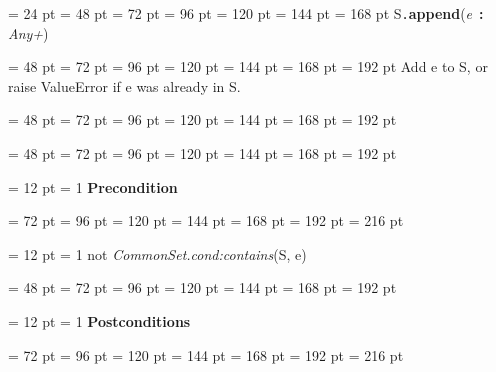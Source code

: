 {{\par \noindent  \leftskip = 24 pt  \leftmargini = 48 pt  \leftmarginii = 72 pt  \leftmarginiii = 96 pt  \leftmarginiv = 120 pt  \leftmarginv = 144 pt  \leftmarginvi = 168 pt S{\tt .\/}{\bf {\large {\bf append\/}}\/}({\em e\/}~{\bf :}  {\em Any+\/}){\par \noindent
{\par \noindent  \leftskip = 48 pt  \leftmargini = 72 pt  \leftmarginii = 96 pt  \leftmarginiii = 120 pt  \leftmarginiv = 144 pt  \leftmarginv = 168 pt  \leftmarginvi = 192 pt  Add e to S, or raise ValueError if e was already in S.\par}
{\par \noindent  \leftskip = 48 pt  \leftmargini = 72 pt  \leftmarginii = 96 pt  \leftmarginiii = 120 pt  \leftmarginiv = 144 pt  \leftmarginv = 168 pt  \leftmarginvi = 192 pt {\par \noindent
\par}
\par}
{\par \noindent  \leftskip = 48 pt  \leftmargini = 72 pt  \leftmarginii = 96 pt  \leftmarginiii = 120 pt  \leftmarginiv = 144 pt  \leftmarginv = 168 pt  \leftmarginvi = 192 pt {\par \noindent
{\par \pagebreak[3.100000] \noindent \hangindent = 12 pt \hangafter = 1 
{\bf Precondition\/}\par}
{\par \noindent  \leftskip = 72 pt  \leftmargini = 96 pt  \leftmarginii = 120 pt  \leftmarginiii = 144 pt  \leftmarginiv = 168 pt  \leftmarginv = 192 pt  \leftmarginvi = 216 pt {\par \noindent
{\par \pagebreak[3.000000] \noindent \hangindent = 12 pt \hangafter = 1 
not  {\em CommonSet.cond:contains\/}(S, e)\par}
\par}
\par}
\par}
\par}
{\par \noindent  \leftskip = 48 pt  \leftmargini = 72 pt  \leftmarginii = 96 pt  \leftmarginiii = 120 pt  \leftmarginiv = 144 pt  \leftmarginv = 168 pt  \leftmarginvi = 192 pt {\par \noindent
{\par \pagebreak[3.100000] \noindent \hangindent = 12 pt \hangafter = 1 
{\bf Postconditions\/}\par}
{\par \noindent  \leftskip = 72 pt  \leftmargini = 96 pt  \leftmarginii = 120 pt  \leftmarginiii = 144 pt  \leftmarginiv = 168 pt  \leftmarginv = 192 pt  \leftmarginvi = 216 pt {\par \noindent
}}}}}}}
